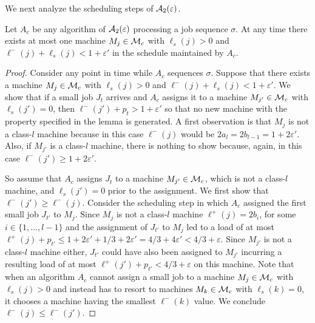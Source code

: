 \documentclass{llncs}
\newcommand{\eps}{\varepsilon}
\begin{document}
We next analyze the scheduling steps of ${\cal A}_2(\eps)$. 
\begin{lemma}\label{lem:sched1}
Let $A_c$ be any algorithm of ${\cal A}_2(\eps)$ processing a job sequence $\sigma$. At any time there
exists at most one machine $M_j\in {\cal M}_c$ with $\ell_s(j) >0$ and $\ell^-(j) + \ell_s(j) < 1+\eps'$
in the schedule maintained by $A_c$.
\end{lemma}
\begin{proof}
Consider any point in time while $A_c$ sequences $\sigma$. Suppose that there exists a machine 
$M_j\in {\cal M}_c$ with $\ell_s(j) >0$ and $\ell^-(j) + \ell_s(j) < 1+\eps'$. We show that if a small
job $J_t$ arrives and $A_c$ assigns it to a machine $M_{j'} \in {\cal M}_c$ with $\ell_s(j') =0$,
then $\ell^-(j')+p_t >1+\eps'$ so that no new machine with the property specified in the lemma is
generated. A first observation is that $M_j$ is not a class-$l$ machine because in this case $\ell^-(j)$ 
would be $2a_l = 2b_{l-1} = 1 +2\eps'$. Also, if $M_{j'}$ is a class-$l$ machine, there is 
nothing to show because, again, in this case $\ell^-(j') \geq  1+2\eps'$.

So assume that $A_c$ assigns $J_t$ to a machine $M_{j'} \in {\cal M}_c$, which is not a class-$l$ machine,
and $\ell_s(j') =0$ prior to the assignment. We first show that $\ell^-(j') \geq \ell^-(j)$. Consider
the scheduling step in which $A_c$ assigned the first small job $J_{t'}$ to $M_j$. Since $M_j$ is not
a class-$l$ machine $\ell^+(j) = 2b_i$, for some $i\in \{1,\ldots, l-1\}$ and the assignment of
$J_{t'}$ to $M_j$ led to a load of at most $\ell^+(j) + p_{t'} \leq 1 + 2\eps' + 1/3+2\eps' 
= 4/3+4\eps' < 4/3 +\eps$. Since $M_{j'}$ is not a class-$l$ machine either, $J_{t'}$ could have also
been assigned to $M_{j'}$ incurring a resulting load of at most $\ell^+(j')+p_{t'} < 4/3 +\eps$ on this
machine. Note that when an algorithm $A_c$ cannot assign a small job to a machine $M_j\in {\cal M}_c$ 
with $\ell_s(j) >0$ and instead has to resort to machines $M_k\in {\cal M}_c$  with $\ell_s(k) =0$, it
chooses a machine having the smallest $\ell^-(k)$ value. We conclude $\ell^-(j) \leq \ell^-(j')$.


\end{proof}
\end{document}
